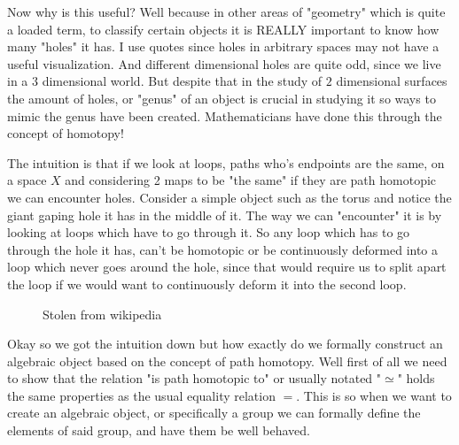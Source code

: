 \documentclass[paper=a4,fontsize=paper,12.5pt]{book}
\newcommand{\3}{\vspace*{3mm}}
\begin{document}
\3

Now why is this useful? Well because in other areas of "geometry" which is quite a loaded term, to classify certain objects it is REALLY important to know how many "holes" it has. I use quotes since holes in arbitrary spaces may not have a useful visualization. And different dimensional holes are quite odd, since we live in a $3$ dimensional world. But despite that in the study of $2$ dimensional surfaces the amount of holes, or "genus" of an object is crucial in studying it so ways to mimic the genus have been created. Mathematicians have done this through the concept of homotopy! 


\newpage

The intuition is that if we look at loops, paths who's endpoints are the same, on a space $X$ and considering 2 maps to be "the same" if they are path homotopic we can encounter holes. Consider a simple object such as the torus and notice the giant gaping hole it has in the middle of it. The way we can "encounter" it is by looking at loops which have to go through it. So any loop which has to go through the hole it has, can't be homotopic or be continuously deformed into a loop which never goes around the hole, since that would require us to split apart the loop if we would want to continuously deform it into the second loop.
\3


{
 \begin{figure}[!hbt]
 \begin{center}
 \begin{minipage}{0.85\textwidth}
 \caption{\label{torus}\small{Stolen from wikipedia}}
 \end{minipage}
 \end{center}
 \end{figure}
 }

\3

Okay so we got the intuition down but how exactly do we formally construct an algebraic object based on the concept of path homotopy. Well first of all we need to show that the relation "is path homotopic to" or usually notated "$\simeq$" holds the same properties as the usual equality relation $=$. This is so when we want to create an algebraic object, or specifically a group we can formally define the elements of said group, and have them be well behaved.
\end{document}
